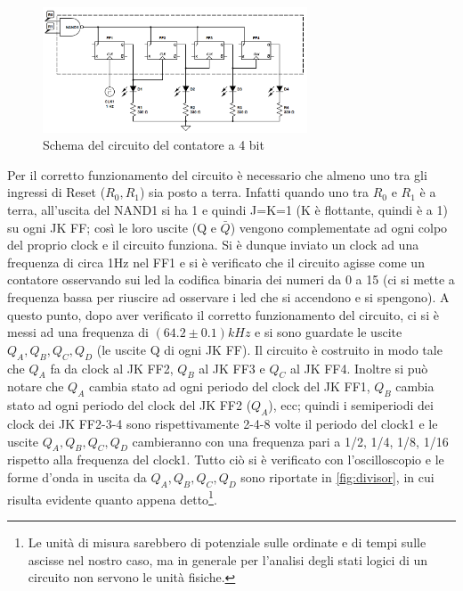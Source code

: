 \documentclass[a4paper,10pt]{article}
\begin{document}
\begin{figure}[H]
	\centering
	\includegraphics[width=0.7\textwidth]{../grafici/counterScheme.png}
	\caption{Schema del circuito del contatore a 4 bit}
	\label{fig:counter}
\end{figure}


Per il corretto funzionamento del circuito è necessario che almeno uno tra gli ingressi di Reset ($R_0 , R_1$)
sia posto a terra. Infatti quando uno tra $R_0$ e $R_1$ è a terra, all'uscita del NAND1 si ha 1 e quindi J=K=1 (K è flottante, quindi è a 1) su ogni JK FF; così le loro uscite (Q e $\bar{Q}$) vengono complementate ad ogni colpo del proprio clock e il circuito funziona.
\newline
\newline
Si è dunque inviato un clock ad una frequenza di circa 1Hz nel FF1 e si è verificato
che il circuito agisse come un contatore osservando sui led la codifica binaria dei numeri da 0 
a 15 (ci si mette a frequenza bassa per riuscire ad osservare i led che si accendono e si spengono).
A questo punto, dopo aver verificato il corretto funzionamento del circuito, ci si è messi ad
una frequenza di $(64.2 \pm 0.1)kHz$ e si sono guardate le uscite $Q_A,Q_B,Q_C,Q_D$ (le uscite Q di ogni JK FF). Il circuito è costruito in modo tale che $Q_A$ fa da clock al JK FF2, $Q_B$ al JK FF3 e $Q_C$ al JK FF4. Inoltre si può notare che $Q_A$ cambia stato ad ogni periodo del clock del JK FF1, $Q_B$ cambia stato ad ogni periodo del clock del JK FF2 ($Q_A$), ecc; quindi i semiperiodi dei clock dei JK FF2-3-4 sono rispettivamente 2-4-8 volte il periodo del clock1 e le uscite $Q_A,Q_B,Q_C,Q_D$ cambieranno con una frequenza pari a 1/2, 1/4, 1/8, 1/16 rispetto alla frequenza del  clock1. Tutto ciò si è verificato con l'oscilloscopio e le forme d'onda in uscita da $Q_A,Q_B,Q_C,Q_D$ sono riportate in \cref{fig:divisor}, in cui risulta evidente quanto appena detto\footnote{Le unità di misura sarebbero di potenziale sulle ordinate e di tempi sulle ascisse nel nostro caso, ma in generale per l'analisi degli stati logici di un circuito non servono le unità fisiche.}.
\end{document}
